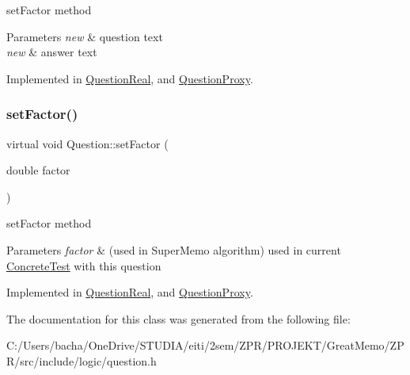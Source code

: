set\+Factor method 


\begin{DoxyParams}{Parameters}
{\em new} & question text \\
\hline
{\em new} & answer text \\
\hline
\end{DoxyParams}


Implemented in \hyperlink{class_question_real_a771a990ea4f4e91574bc2cc5ec101ab5}{Question\+Real}, and \hyperlink{class_question_proxy_a420fb6fae2d691aa0c574939b815a205}{Question\+Proxy}.

\mbox{\label{class_question_ad5c8dfa4de5cce04fad3e31c0ccee1a0}} 
\subsubsection{\texorpdfstring{set\+Factor()}{setFactor()}}
{\footnotesize\ttfamily virtual void Question\+::set\+Factor (\begin{DoxyParamCaption}\item[{double}]{factor }\end{DoxyParamCaption})\hspace{0.3cm}{\ttfamily [pure virtual]}}



set\+Factor method 


\begin{DoxyParams}{Parameters}
{\em factor} & (used in Super\+Memo algorithm) used in current \hyperlink{class_concrete_test}{Concrete\+Test} with this question \\
\hline
\end{DoxyParams}


Implemented in \hyperlink{class_question_real_a3c023bd8ecbba7ad59620e2216f0705a}{Question\+Real}, and \hyperlink{class_question_proxy_a6993b6a84ebaf916fce21f41b0401fe7}{Question\+Proxy}.



The documentation for this class was generated from the following file\+:\begin{DoxyCompactItemize}
\item 
C\+:/\+Users/bacha/\+One\+Drive/\+S\+T\+U\+D\+I\+A/eiti/2sem/\+Z\+P\+R/\+P\+R\+O\+J\+E\+K\+T/\+Great\+Memo/\+Z\+P\+R/src/include/logic/question.\+h\end{DoxyCompactItemize}
